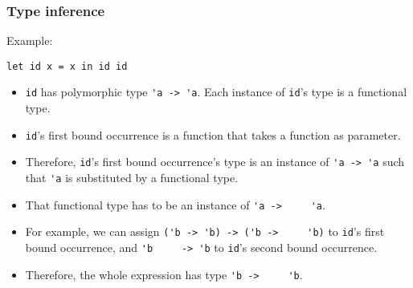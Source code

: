 \documentclass[12pt,red]{beamer}
\begin{document}
\begin{frame}
  \frametitle{Type inference}

  Example:
  \begin{beamerboxesrounded}[shadow=true]{}
    \begin{center}
      \lstinline{let id x = x in id id}
    \end{center}
  \end{beamerboxesrounded}

  \begin{itemize}
  \item \lstinline{id} has polymorphic type \lstinline{'a -> 'a}.
    Each instance of \lstinline{id}'s type is a functional type.

  \item \lstinline{id}'s first bound occurrence is a function that
    takes a function as parameter.

  \item Therefore, \lstinline{id}'s first bound occurrence's type is
    an instance of \lstinline{'a -> 'a} such that \lstinline{'a} is
    substituted by a functional type.

  \item That functional type has to be an instance of \lstinline{'a ->
    'a}.

  \item For example, we can assign \lstinline{('b -> 'b) -> ('b ->
    'b)} to \lstinline{id}'s first bound occurrence, and \lstinline{'b
    -> 'b} to \lstinline{id}'s second bound occurrence.

  \item Therefore, the whole expression has type \lstinline{'b ->
    'b}.
  \end{itemize}
\end{frame}
\end{document}
